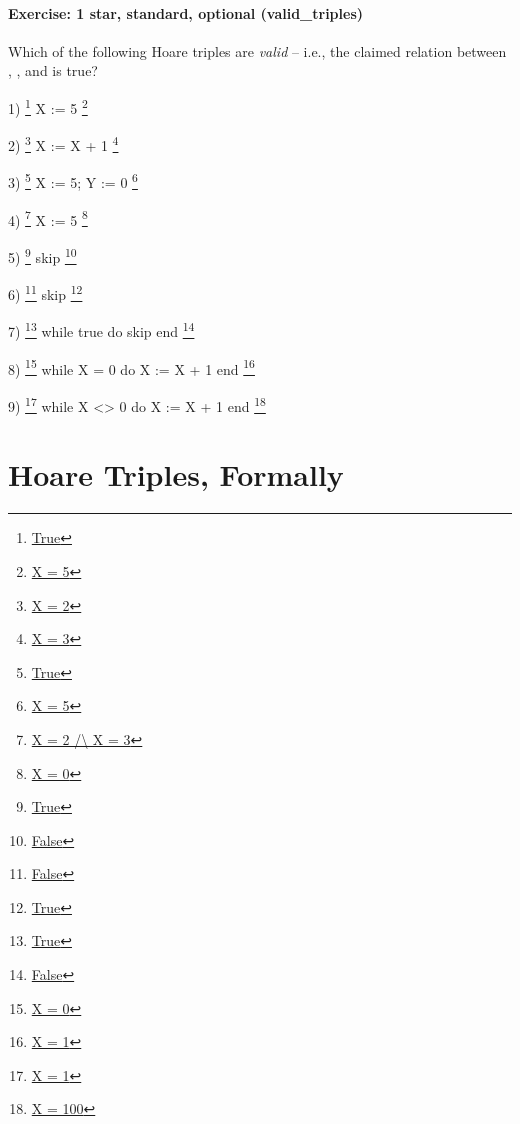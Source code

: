 \documentclass[12pt]{report}
\begin{document}
\paragraph{Exercise: 1 star, standard, optional (valid\_triples)}




    Which of the following Hoare triples are \textit{valid} -- i.e., the
    claimed relation between , , and  is true?


   1) \footnote{\url{True}} X := 5 \footnote{\url{X = 5}}


   2) \footnote{\url{X = 2}} X := X + 1 \footnote{\url{X = 3}}


   3) \footnote{\url{True}} X := 5; Y := 0 \footnote{\url{X = 5}}


   4) \footnote{\url{X = 2 /\ X = 3}} X := 5 \footnote{\url{X = 0}}


   5) \footnote{\url{True}} skip \footnote{\url{False}}


   6) \footnote{\url{False}} skip \footnote{\url{True}}


   7) \footnote{\url{True}} while true do skip end \footnote{\url{False}}


   8) \footnote{\url{X = 0}}
        while X = 0 do X := X + 1 end
      \footnote{\url{X = 1}}


   9) \footnote{\url{X = 1}}
        while X <> 0 do X := X + 1 end
      \footnote{\url{X = 100}}

\begin{coqdoccode}
\coqdocemptyline
\end{coqdoccode}
\section{Hoare Triples, Formally}
\end{document}
